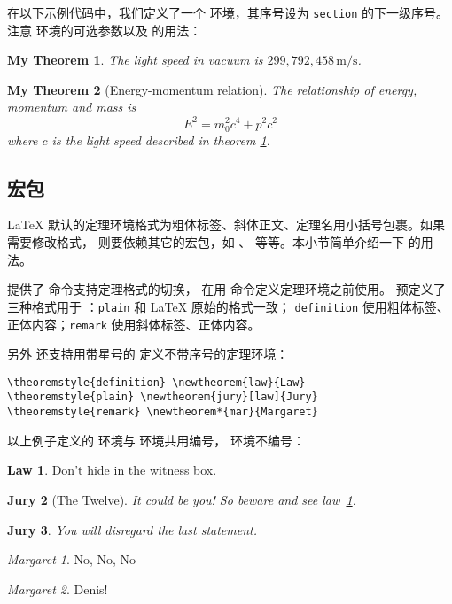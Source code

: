 在以下示例代码中，我们定义了一个  环境，其序号设为 \texttt{section} 的下一级序号。
注意  环境的可选参数以及  的用法：
\begin{example}
\newtheorem{mythm}{My Theorem}[section]
\begin{mythm}\label{thm:light}
The light speed in vacuum
is $299,792,458\,\mathrm{m/s}$.
\end{mythm}
\begin{mythm}[Energy-momentum relation]
The relationship of energy,
momentum and mass is
\[E^2 = m_0^2 c^4 + p^2 c^2\]
where $c$ is the light speed
described in theorem \ref{thm:light}.
\end{mythm}
\end{example}

\subsection{ 宏包}\label{subsec:amsthm}

\LaTeX{} 默认的定理环境格式为粗体标签、斜体正文、定理名用小括号包裹。如果需要修改格式，
则要依赖其它的宏包，如 、 等等。本小节简单介绍一下  的用法。

 提供了  命令支持定理格式的切换，
在用  命令定义定理环境之前使用。
 预定义了三种格式用于 ：\texttt{plain} 和 \LaTeX{} 原始的格式一致；
\texttt{defi\-ni\-tion} 使用粗体标签、正体内容；\texttt{remark} 使用斜体标签、正体内容。

另外  还支持用带星号的  定义不带序号的定理环境：
\begin{verbatim}
\theoremstyle{definition} \newtheorem{law}{Law}
\theoremstyle{plain} \newtheorem{jury}[law]{Jury}
\theoremstyle{remark} \newtheorem*{mar}{Margaret}
\end{verbatim}
\theoremstyle{definition} \newtheorem{law}{Law}
\theoremstyle{plain} \newtheorem{jury}[law]{Jury}
\theoremstyle{remark} \newtheorem*{mar}{Margaret}

以上例子定义的  环境与  环境共用编号， 环境不编号：
\begin{example}
\begin{law}\label{law:box}
Don't hide in the witness box.
\end{law}
\begin{jury}[The Twelve]
It could be you! So beware and
see law~\ref{law:box}.\end{jury}
\begin{jury}
You will disregard the last
statement.\end{jury}
\begin{mar}No, No, No\end{mar}
\begin{mar}Denis!\end{mar}
\end{example}

